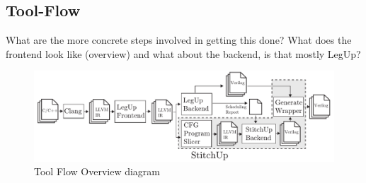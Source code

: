 \subsection{Tool-Flow}
What are the more concrete steps involved in getting this done?
What does the frontend look like (overview) and what about the backend,
is that mostly LegUp?

\begin{figure}[!t]
\centering
\includegraphics[width=6in]{./imgs/tool-flow.pdf}
\caption{Tool Flow Overview diagram}
\label{fig:tool_flow_diagram}
\end{figure}


